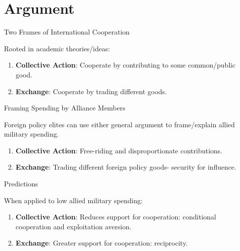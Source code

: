 \documentclass[12pt]{beamer}
\begin{document}

\section{Argument} 


\begin{frame}{Two Frames of International Cooperation}

Rooted in academic theories/ideas:

\pause 
\begin{enumerate} 
\item \textbf{Collective Action}: Cooperate by contributing to some common/public good. 
\pause 
\item \textbf{Exchange}: Cooperate by trading different goods. 
\end{enumerate}


\end{frame} 


\begin{frame}{Framing Spending by Alliance Members}

Foreign policy elites can use either general argument to frame/explain allied military spending. 

\pause 
\begin{enumerate} 
\item \textbf{Collective Action}: Free-riding and disproportionate contributions. 
\pause 
\item \textbf{Exchange}: Trading different foreign policy goods- security for influence. 
\end{enumerate}


\end{frame} 


\begin{frame}{Predictions}

When applied to low allied military spending: 
\pause 
\begin{enumerate} 
\item \textbf{Collective Action}: Reduces support for cooperation: conditional cooperation and exploitation aversion. 
\pause 
\item \textbf{Exchange}: Greater support for cooperation: reciprocity. 
\end{enumerate}


\end{frame} 
\end{document}
